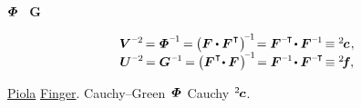  $\mathboldPhi$ ~$\bm{G}$   

\nopagebreak\vspace{-0.2em}\begin{equation}\label{moredeformationtensors.nonlinear}
\begin{array}{c}
\bm{V}^{\expminustwo} \hspace{-0.25ex}
= \mathboldPhi^{\expminusone} \hspace{-0.2ex}
= \hspace{-0.1ex} \left( \bm{F} \dotp \bm{F}^{\hspace{.1ex}\T} \hspace{.1ex} \right)^{\hspace{-0.33ex}\expminusone} \hspace{-0.4ex}
= \bm{F}^{\expminusT} \hspace{-0.3ex} \dotp \bm{F}^{\expminusone} \hspace{-0.25ex}
\equiv {^2\hspace{-0.2ex}\bm{c}}
\hspace{.2ex} ,
\\
%
\bm{U}^{\expminustwo} \hspace{-0.25ex}
= \bm{G}^{\hspace{.12ex}\expminusone} \hspace{-0.2ex}
= \hspace{-0.1ex} \left( \bm{F}^{\hspace{.1ex}\T} \hspace{-0.4ex} \dotp \bm{F} \hspace{.2ex} \right)^{\hspace{-0.33ex}\expminusone} \hspace{-0.4ex}
= \bm{F}^{\expminusone} \hspace{-0.3ex} \dotp \bm{F}^{\expminusT} \hspace{-0.3ex}
\equiv {^2\hspace{-0.4ex}\bm{f}}
\hspace{-0.1ex} ,
\end{array}
\end{equation}

\vspace{-0.2em}\noindent
{}  \href{https://en.wikipedia.org/wiki/Gabrio_Piola}{Piola}  \href{https://en.wikipedia.org/wiki/Josef_Finger}{Finger}.
  Cauchy--Green~${\hspace{-0.1ex}\mathboldPhi\hspace{.1ex}}$\ru{\:---} Cauchy~${\hspace{-0.2ex}{^2}\hspace{-0.2ex}\bm{c}}$.

